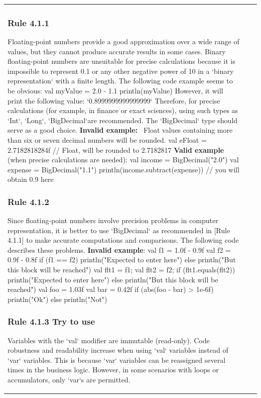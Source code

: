 \begin{center}
\begin{tabular}{ |p{}|p{}|p{}| }
{{{{{\subsubsection*{\textbf{Rule 4.1.1}}
Floating-point numbers provide a good approximation over a wide range of values, but they cannot produce accurate results in some cases.
Binary floating-point numbers are unsuitable for precise calculations because it is impossible to represent 0.1 or any other negative power of 10 in a `binary representation` with a finite length.
The following code example seems to be obvious:
    val myValue = 2.0 - 1.1
    println(myValue)
However, it will print the following value: `0.8999999999999999`
Therefore, for precise calculations (for example, in finance or exact sciences), using such types as `Int`, `Long`, `BigDecimal`are recommended.
The `BigDecimal` type should serve as a good choice.
\textbf{Invalid example:} \
Float values containing more than six or seven decimal numbers will be rounded.
 val eFloat = 2.7182818284f // Float, will be rounded to 2.7182817
\textbf{Valid example} (when precise calculations are needed):
    val income = BigDecimal("2.0")
    val expense = BigDecimal("1.1")
    println(income.subtract(expense)) // you will obtain 0.9 here
\subsubsection*{\textbf{Rule 4.1.2}}
Since floating-point numbers involve precision problems in computer representation, it is better to use `BigDecimal` as recommended in [Rule 4.1.1] to make accurate computations and comparisons. The following code describes these problems.
\textbf{Invalid example}:
val f1 = 1.0f - 0.9f
val f2 = 0.9f - 0.8f
if (f1 == f2) {
    println("Expected to enter here")
} else {
    println("But this block will be reached")
}
val flt1 = f1;
val flt2 = f2;
if (flt1.equals(flt2)) {
    println("Expected to enter here")
} else {
    println("But this block will be reached")
}
val foo = 1.03f
val bar = 0.42f
if (abs(foo - bar) > 1e-6f) {
    println("Ok")
} else {
    println("Not")
}
\subsubsection*{\textbf{Rule 4.1.3 Try to use}}
Variables with the `val` modifier are immutable (read-only).
Code robustness and readability increase when using `val` variables instead of `var` variables.
This is because `var` variables can be reassigned several times in the business logic.
However, in some scenarios with loops or accumulators, only `var`s are permitted.
}}}}}
\end{tabular}
\end{center}
